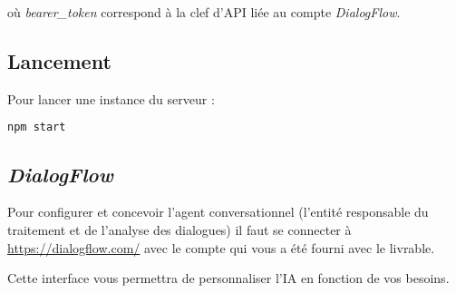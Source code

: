 où \og \emph{bearer\_token} \fg{} correspond à la clef d'API liée au compte \emph{DialogFlow}.

\subsection{Lancement}

Pour lancer une instance du serveur :
\begin{lstlisting}[language=bash]
    npm start
\end{lstlisting}

\subsection{\emph{DialogFlow}}

Pour configurer et concevoir l'agent conversationnel (l'entité responsable du traitement et de l'analyse des dialogues) il faut se connecter à \url{https://dialogflow.com/} avec le compte
qui vous a été fourni avec le livrable. 

Cette interface vous permettra de personnaliser l'IA en fonction de vos besoins.
